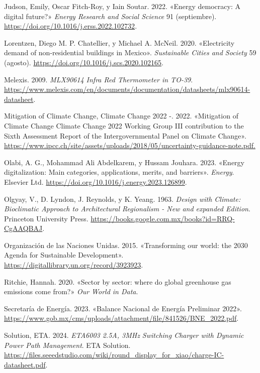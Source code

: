 \documentclass[
  letterpaper,
  DIV=11,
  numbers=noendperiod]{scrreport}
\newlength{\cslhangindent}
\newenvironment{CSLReferences}[2] %
 {\begin{list}{}{%
  \setlength{\itemindent}{0pt}
  \setlength{\leftmargin}{0pt}
  \setlength{\parsep}{0pt}
  \ifodd #1
   \setlength{\leftmargin}{\cslhangindent}
   \setlength{\itemindent}{-1\cslhangindent}
  \fi
  \setlength{\itemsep}{#2\baselineskip}}}
 {\end{list}}
\begin{document}
\begin{CSLReferences}{1}{0}
Judson, Emily, Oscar Fitch-Roy, y Iain Soutar. 2022. {«Energy democracy:
A digital future?»} \emph{Energy Research and Social Science} 91
(septiembre). \url{https://doi.org/10.1016/j.erss.2022.102732}.

Lorentzen, Diego M. P. Chatellier, y Michael A. McNeil. 2020.
{«Electricity demand of non-residential buildings in Mexico»}.
\emph{Sustainable Cities and Society} 59 (agosto).
\url{https://doi.org/10.1016/j.scs.2020.102165}.

Melexis. 2009. \emph{MLX90614 Infra Red Thermometer in TO-39}.
\url{https://www.melexis.com/en/documents/documentation/datasheets/mlx90614-datasheet}.

Mitigation of Climate Change, Climate Change 2022 -. 2022. {«Mitigation
of Climate Change Climate Change 2022 Working Group III contribution to
the Sixth Assessment Report of the Intergovernmental Panel on Climate
Change»}.
\url{https://www.ipcc.ch/site/assets/uploads/2018/05/uncertainty-guidance-note.pdf.}

Olabi, A. G., Mohammad Ali Abdelkarem, y Hussam Jouhara. 2023. {«Energy
digitalization: Main categories, applications, merits, and barriers»}.
\emph{Energy}. Elsevier Ltd.
\url{https://doi.org/10.1016/j.energy.2023.126899}.

Olgyay, V., D. Lyndon, J. Reynolds, y K. Yeang. 1963. \emph{Design with
Climate: Bioclimatic Approach to Architectural Regionalism - New and
expanded Edition}. Princeton University Press.
\url{https://books.google.com.mx/books?id=RRQ-CgAAQBAJ}.

Organización de las Naciones Unidas. 2015. {«Transforming our world: the
2030 Agenda for Sustainable Development»}.
\url{https://digitallibrary.un.org/record/3923923}.

Ritchie, Hannah. 2020. {«Sector by sector: where do global greenhouse
gas emissions come from?»} \emph{Our World in Data}.

Secretaría de Energía. 2023. {«Balance Nacional de Energía Preliminar
2022»}.
\url{https://www.gob.mx/cms/uploads/attachment/file/841526/BNE_2022.pdf}.

Solution, ETA. 2024. \emph{ETA6003 2.5A, 3MHz Switching Charger with
Dynamic Power Path Management}. ETA Solution.
\url{https://files.seeedstudio.com/wiki/round_display_for_xiao/charge-IC-datasheet.pdf}.


\end{CSLReferences}
\end{document}
